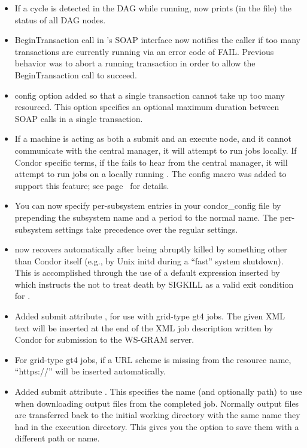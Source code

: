 \begin{itemize}
\item If a  cycle is detected in the DAG while 
running,  now prints (in the  file)
the status of all DAG nodes.

\item BeginTransaction call in 's SOAP interface now
  notifies the caller if too many transactions are currently running
  via an error code of FAIL. Previous behavior was to abort a running
  transaction in order to allow the BeginTransaction call to succeed.
  
\item {} config option added so that a
  single transaction cannot take up too many 
  resourced. This option specifies an optional maximum duration
  between SOAP calls in a single transaction.

\item If a machine is acting as both a submit and an execute node, and it
  cannot communicate with the central manager, it will attempt to run jobs
  locally.  If Condor specific terms, if the  fails to hear
  from the central manager, it will attempt to run jobs on a locally running
  .  The  config
  macro was added to support this feature; see
  page~\pageref{param:ScheddAssumeNegotiatorGone} for details.

\item You can now specify per-subsystem entries in your condor\_config file
by prepending the subsystem name and a period to the normal name.  The
per-subsystem settings take precedence over the regular settings.

\item {} now recovers automatically after being abruptly
killed by something other than Condor itself (e.g., by Unix initd
during a ``fast'' system shutdown).  This is accomplished through the
use of a default  expression inserted by
 which instructs the  not to treat
death by SIGKILL as a valid exit condition for .

\item Added submit attribute , for use with grid-type
gt4 jobs. The given XML text will be inserted at the end of the XML job
description written by Condor for submission to the WS-GRAM server.

\item For grid-type gt4 jobs, if a URL scheme is missing from the resource
name, ``https://'' will be inserted automatically.

\item Added submit attribute .
This specifies the name (and optionally path) to use when downloading output
files from the completed job.  Normally output files are transferred back
to the initial working directory with the same name they had in the execution
directory.  This gives you the option to save them with a different path
or name.

\end{itemize}


